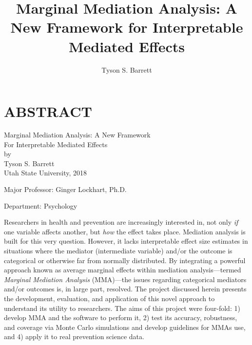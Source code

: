 \documentclass[]{DissertateUSU}
\title{Marginal Mediation Analysis: A New Framework for Interpretable Mediated
Effects}
\author{Tyson S. Barrett}
\date{}
\begin{document}
\maketitle

 \pagestyle{empty} \copyrightpage

\newpage

\pagestyle{fancy}  \fancyhead[R]{\thepage}
\fancyfoot[C]{} \chapter*{ABSTRACT}

\doublespacing

\begin{center}
Marginal Mediation Analysis: A New Framework \\ 
For Interpretable Mediated Effects \\
\vspace{12pt}
by \\
\vspace{12pt}
Tyson S. Barrett \\
Utah State University, 2018
\end{center}

\vspace{12pt}

\singlespacing
\noindent Major Professor: Ginger Lockhart, Ph.D.

\noindent Department: Psychology

\vspace{12pt}

\doublespacing
Researchers in health and prevention are increasingly interested in, not
only \emph{if} one variable affects another, but \emph{how} the effect
takes place. Mediation analysis is built for this very question.
However, it lacks interpretable effect size estimates in situations
where the mediator (intermediate variable) and/or the outcome is
categorical or otherwise far from normally distributed. By integrating a
powerful approach known as average marginal effects within mediation
analysis---termed \emph{Marginal Mediation Analysis} (MMA)---the issues
regarding categorical mediators and/or outcomes is, in large part,
resolved. The project discussed herein presents the development,
evaluation, and application of this novel approach to understand its
utility to researchers. The aims of this project were four-fold: 1)
develop MMA and the software to perform it, 2) test its accuracy,
robustness, and coverage via Monte Carlo simulations and develop
guidelines for MMAs use, and 4) apply it to real prevention science
data.
\end{document}
